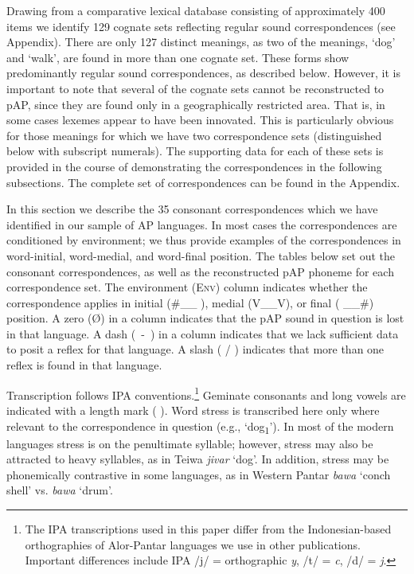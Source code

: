  Drawing from a comparative lexical database consisting of approximately 400 items we identify 129 cognate sets reflecting regular sound correspondences (see Appendix). There are only 127 distinct meanings, as two of the meanings, `dog' and `walk', are found in more than one cognate set. These forms show predominantly regular sound correspondences, as described below. However, it is important to note that several of the cognate sets cannot be reconstructed to pAP, since they are found only in a geographically restricted area. That is, in some cases lexemes appear to have been innovated. This is particularly obvious for those meanings for which we have two correspondence sets (distinguished below with subscript numerals). The supporting data for each of these sets is provided in the course of demonstrating the correspondences in the following subsections. The complete set of correspondences can be found in the Appendix. 

In this section we describe the 35 consonant correspondences which we have identified in our sample of AP languages. In most cases the correspondences are conditioned by environment; we thus provide examples of the correspondences in word-initial, word-medial, and word-final position. The tables below set out the consonant correspondences, as well as the reconstructed pAP phoneme for each correspondence set. The environment (\textsc{Env}) column indicates whether the correspondence applies in initial (\#\_\_ ), medial (V\_\_V), or final ( \_\_\#) position. A zero ({\O}) in a column indicates that the pAP sound in question is lost in that language. A dash (~-~) in a column indicates that we lack sufficient data to posit a reflex for that language. A slash ( / ) indicates that more than one reflex is found in that language. 

Transcription follows IPA conventions.\footnote{ The IPA transcriptions used in this paper differ from the Indonesian-based orthographies of Alor-Pantar languages we use in other publications. Important differences include IPA /j/ = orthographic \textit{y}, /t{\textesh}/ = \textit{c}, /d{\textyogh}/ = \textit{j}.} Geminate consonants and long vowels are indicated with a length mark ( {\textlengthmark} ). Word stress is transcribed here only where relevant to the correspondence in question (e.g., `dog\textsubscript{1}'). In most of the modern languages stress is on the penultimate syllable; however, stress may also be attracted to heavy syllables, as in Teiwa \textit{ji{\textprimstress}var} `dog'. In addition, stress may be phonemically contrastive in some languages, as in Western Pantar \textit{ba}\textit{{\textprimstress}}\textit{wa} `conch shell' vs. \textit{{\textprimstress}}\textit{bawa} `drum'.

